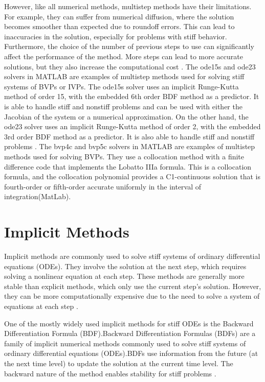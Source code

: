 However, like all numerical methods, multistep methods have their limitations. For example, they can suffer from numerical diffusion, where the solution becomes smoother than expected due to roundoff errors. This can lead to inaccuracies in the solution, especially for problems with stiff behavior. Furthermore, the choice of the number of previous steps to use can significantly affect the performance of the method. More steps can lead to more accurate solutions, but they also increase the computational cost \cite{math7121158}.
The ode15s and ode23 solvers in MATLAB are examples of multistep methods used for solving stiff systems of BVPs or IVPs. The ode15s solver uses an implicit Runge-Kutta method of order 15, with the embedded 6th order BDF method as a predictor. It is able to handle stiff and nonstiff problems and can be used with either the Jacobian of the system or a numerical approximation. On the other hand, the ode23 solver uses an implicit Runge-Kutta method of order 2, with the embedded 3rd order BDF method as a predictor. It is also able to handle stiff and nonstiff problems \cite{wong2020lecture}.
The bvp4c and bvp5c solvers in MATLAB are examples of multistep methods used for solving BVPs. They use a collocation method with a finite difference code that implements the Lobatto IIIa formula. This is a collocation formula, and the collocation polynomial provides a C1-continuous solution that is fourth-order or fifth-order accurate uniformly in the interval of integration(MatLab).

\section{Implicit Methods}
Implicit methods are commonly used to solve stiff systems of ordinary differential equations (ODEs). They involve the solution at the next step, which requires solving a nonlinear equation at each step. These methods are generally more stable than explicit methods, which only use the current step's solution. However, they can be more computationally expensive due to the need to solve a system of equations at each step \cite{thohura2013numerical}.

One of the mostly widely used implicit methods for stiff ODEs is the Backward Differentiation Formula (BDF).Backward Differentiation Formulas (BDFs) are a family of implicit numerical methods commonly used to solve stiff systems of ordinary differential equations (ODEs).BDFs use information from the future (at the next time level) to update the solution at the current time level. The backward nature of the method enables stability for stiff problems \cite{numericalrecipes}.

